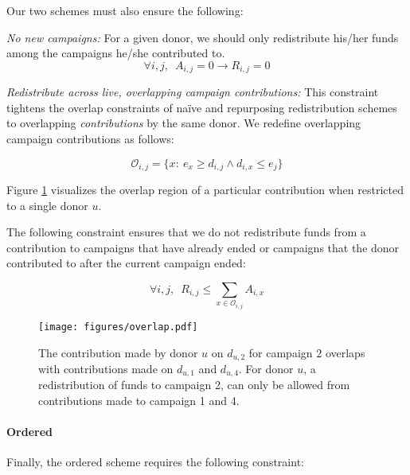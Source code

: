 \subsubsection{\Cpr}

Our two \cpr schemes must also ensure the following:

\begin{enumerate}[label={[\bf\sc{CP\arabic*}]},wide =1em]

\item \emph{No new campaigns:} For a given donor, we should only redistribute his/her funds among the campaigns he/she contributed to.
\[\forall i,j, \;\ A_{i, j} = 0 \rightarrow R_{i, j} = 0 \]

\item \emph{Redistribute across live, overlapping campaign contributions:} This constraint tightens the overlap constraints of na\"ive and repurposing redistribution schemes to overlapping \textit{contributions} by the same donor. We redefine overlapping campaign contributions as follows:

\[\mathcal{O}_{i, j} = \{x: \ e_x \geq d_{i, j} \wedge d_{i, x} \leq e_j\}\]

Figure \ref{fig:overlap} visualizes the overlap region of a particular contribution when restricted to a single donor $u$. 

The following constraint ensures that we do not redistribute funds from a contribution to campaigns that have already ended or campaigns that the donor contributed to after the current campaign ended:

\[\forall i,j, \;\ R_{i, j} \leq \sum_{x \in \mathcal{O}_{i, j}} A_{i, x}\]

\begin{figure}[htb]
    \centering
    \texttt{[image: figures/overlap.pdf]}
    \caption{The contribution made by donor $u$ on $d_{u,2}$ for campaign $2$ overlaps with contributions made on $d_{u,1}$ and $d_{u,4}$. 
    For donor $u$, a redistribution of funds to campaign 2, can only be allowed from contributions made to campaign 1 and 4.}
    \label{fig:overlap}
\end{figure}

\end{enumerate}

\paragraph{Ordered \cpr}

Finally, the ordered \cpr scheme requires the following constraint:

